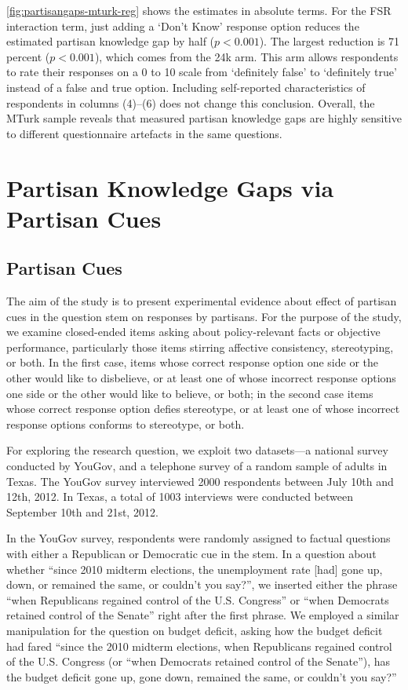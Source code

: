 \documentclass[12pt, letterpaper]{article}
\begin{document}
\cref{fig:partisangaps-mturk-reg} shows the estimates in absolute terms.
For the FSR interaction term, just adding a `Don't Know' response option reduces the estimated partisan knowledge gap by half ($p<0.001$).
The largest reduction is 71 percent ($p<0.001$), which comes from the 24k arm. This arm allows respondents to rate their responses on a 0 to 10 scale from `definitely false' to `definitely true' instead of a false and true option. Including self-reported characteristics of respondents in columns (4)--(6) does not change this conclusion. Overall, the MTurk sample reveals that measured partisan knowledge gaps are highly sensitive to different questionnaire artefacts in the same questions.


\section*{Partisan Knowledge Gaps via Partisan Cues}

\subsection*{Partisan Cues}\label{subsec:partisan-cues}
The aim of the study is to present experimental evidence about effect of partisan cues in the question stem on responses by partisans. For the purpose of the study, we examine closed-ended items asking about policy-relevant facts or objective performance, particularly those items stirring affective consistency, stereotyping, or both.  In the first case, items whose correct response option one side or the other would like to disbelieve, or at least one of whose incorrect response options one side or the other would like to believe, or both; in the second case items whose correct response option defies stereotype, or at least one of whose incorrect response options conforms to stereotype, or both.  

For exploring the research question, we exploit two datasets---a national survey conducted by YouGov, and a telephone survey of a random sample of adults in Texas. The YouGov survey interviewed 2000 respondents between July 10th and 12th, 2012.  In Texas, a total of 1003 interviews were conducted between September 10th and 21st, 2012. 

In the YouGov survey, respondents were randomly assigned to factual questions with either a Republican or Democratic cue in the stem. In a question about whether ``since 2010 midterm elections, the unemployment rate [had] gone up, down, or remained the same, or couldn't you say?'', we inserted either the phrase “when Republicans regained control of the U.S. Congress'' or ``when Democrats retained control of the Senate” right after the first phrase. We employed a similar manipulation for the question on budget deficit, asking how the budget deficit had fared “since the 2010 midterm elections, when Republicans regained control of the U.S. Congress (or ``when Democrats retained control of the Senate''), has the budget deficit gone up, gone down, remained the same, or couldn't you say?''
\end{document}
